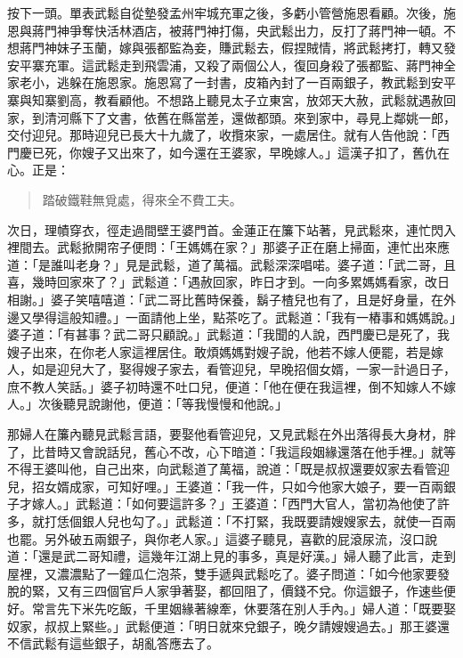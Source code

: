 按下一頭。單表武鬆自從墊發孟州牢城充軍之後，多虧小管營施恩看顧。次後，施恩與蔣門神爭奪快活林酒店，被蔣門神打傷，央武鬆出力，反打了蔣門神一頓。不想蔣門神妹子玉蘭，嫁與張都監為妾，賺武鬆去，假捏賊情，將武鬆拷打，轉又發安平寨充軍。這武鬆走到飛雲浦，又殺了兩個公人，復回身殺了張都監、蔣門神全家老小，逃躲在施恩家。施恩寫了一封書，皮箱內封了一百兩銀子，教武鬆到安平寨與知寨劉高，教看顧他。不想路上聽見太子立東宮，放郊天大赦，武鬆就遇赦回家，到清河縣下了文書，依舊在縣當差，還做都頭。來到家中，尋見上鄰姚一郎，交付迎兒。那時迎兒已長大十九歲了，收攬來家，一處居住。就有人告他說：「西門慶已死，你嫂子又出來了，如今還在王婆家，早晚嫁人。」這漢子扣了，舊仇在心。正是：
\begin{quote}
踏破鐵鞋無覓處，得來全不費工夫。
\end{quote}

次日，理幘穿衣，徑走過間壁王婆門首。金蓮正在簾下站著，見武鬆來，連忙閃入裡間去。武鬆掀開帘子便問：「王媽媽在家？」那婆子正在磨上掃面，連忙出來應道：「是誰叫老身？」見是武鬆，道了萬福。武鬆深深唱喏。婆子道：「武二哥，且喜，幾時回家來了？」武鬆道：「遇赦回家，昨日才到。一向多累媽媽看家，改日相謝。」婆子笑嘻嘻道：「武二哥比舊時保養，鬍子楂兒也有了，且是好身量，在外邊又學得這般知禮。」一面請他上坐，點茶吃了。武鬆道：「我有一樁事和媽媽說。」婆子道：「有甚事？武二哥只顧說。」武鬆道：「我聞的人說，西門慶已是死了，我嫂子出來，在你老人家這裡居住。敢煩媽媽對嫂子說，他若不嫁人便罷，若是嫁人，如是迎兒大了，娶得嫂子家去，看管迎兒，早晚招個女婿，一家一計過日子，庶不教人笑話。」婆子初時還不吐口兒，便道：「他在便在我這裡，倒不知嫁人不嫁人。」次後聽見說謝他，便道：「等我慢慢和他說。」

那婦人在簾內聽見武鬆言語，要娶他看管迎兒，又見武鬆在外出落得長大身材，胖了，比昔時又會說話兒，舊心不改，心下暗道：「我這段姻緣還落在他手裡。」就等不得王婆叫他，自己出來，向武鬆道了萬福，說道：「既是叔叔還要奴家去看管迎兒，招女婿成家，可知好哩。」王婆道：「我一件，只如今他家大娘子，要一百兩銀子才嫁人。」武鬆道：「如何要這許多？」王婆道：「西門大官人，當初為他使了許多，就打恁個銀人兒也勾了。」武鬆道：「不打緊，我既要請嫂嫂家去，就使一百兩也罷。另外破五兩銀子，與你老人家。」這婆子聽見，喜歡的屁滾尿流，沒口說道：「還是武二哥知禮，這幾年江湖上見的事多，真是好漢。」婦人聽了此言，走到屋裡，又濃濃點了一鐘瓜仁泡茶，雙手遞與武鬆吃了。婆子問道：「如今他家要發脫的緊，又有三四個官戶人家爭著娶，都回阻了，價錢不兌。你這銀子，作速些便好。常言先下米先吃飯，千里姻緣著線牽，休要落在別人手內。」婦人道：「既要娶奴家，叔叔上緊些。」武鬆便道：「明日就來兌銀子，晚夕請嫂嫂過去。」那王婆還不信武鬆有這些銀子，胡亂答應去了。

